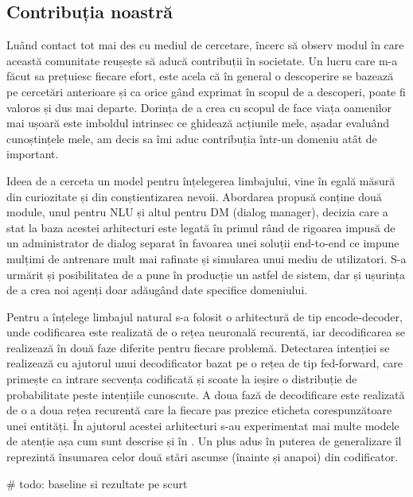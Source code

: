\subsection{Contribuția noastră}

Luând contact tot mai des cu mediul de cercetare, încerc să observ modul în care această comunitate reușește să aducă contribuții în societate. Un lucru care m-a făcut sa prețuiesc fiecare efort, este acela că în general o descoperire se bazează pe cercetări anterioare și ca orice gând exprimat în scopul de a descoperi, poate fi valoros și dus mai departe. Dorința de a crea cu scopul de face viața oamenilor mai ușoară este imboldul intrinsec ce ghidează acțiunile mele, așadar evaluând cunoștințele mele, am decis sa îmi aduc contribuția într-un domeniu atât de important.

Ideea de a cerceta un model pentru înțelegerea limbajului, vine în egală măsură din curiozitate și din conștientizarea nevoii. Abordarea propusă conține două module, unul pentru NLU și altul pentru DM (dialog manager), decizia care a stat la baza acestei arhitecturi este legată în primul rând de rigoarea impusă de un administrator de dialog separat în favoarea unei soluții end-to-end ce impune mulțimi de antrenare mult mai rafinate și simularea unui mediu de utilizatori. S-a urmărit și posibilitatea de a pune în producție un astfel de sistem, dar și ușurința de a crea noi agenți doar adăugând date specifice domeniului.


Pentru a înțelege limbajul natural s-a folosit o arhitectură de tip encode-decoder, unde codificarea este realizată de o rețea neuronală recurentă, iar decodificarea se realizează în două faze diferite pentru fiecare problemă. Detectarea intenției se realizează cu ajutorul unui decodificator bazat pe o rețea de tip fed-forward, care primește ca intrare secvența codificată și scoate la ieșire o distribuție de probabilitate peste intențiile cunoscute. A doua fază de decodificare este realizată de o a doua rețea recurentă care la fiecare pas prezice eticheta corespunzătoare unei entități. În ajutorul acestei arhitecturi s-au experimentat mai multe modele de atenție așa cum sunt descrise și în \cite{trans_luong_manning}. Un plus adus în puterea de generalizare îl reprezintă însumarea celor două stări ascunse (înainte și anapoi) din codificator.

\# todo: baseline si rezultate pe scurt


